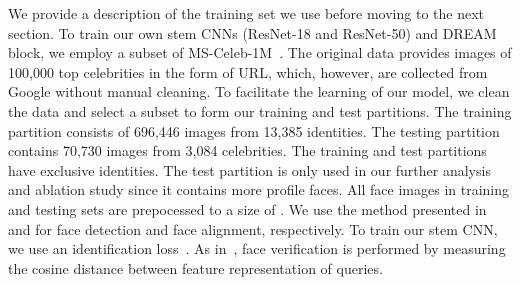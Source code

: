 \documentclass[10pt,twocolumn,letterpaper]{article}
\begin{document}
\begin{table*}[t]
\footnotesize
\begin{center}
\caption{Results on Celebrities in Frontal-Profile (CFP) with Frontal-Profile setting. Equal error rate (EER) is reported. Lower is better. The best result in each row are given in bold.}
\vskip -0.1cm
\label{tab:mainExperiment}
\end{center}
\vspace{-0.25cm}
\vskip -0.4cm
\end{table*}

We provide a description of the training set we use before moving to the next section.
To train our own stem CNNs (ResNet-18 and ResNet-50) and DREAM block, we employ a subset of MS-Celeb-1M~\cite{guo2016ms}. The original data provides images of 100,000 top celebrities in the form of URL, which, however, are collected from Google without manual cleaning. To facilitate the learning of our model, we clean the data and select a subset to form our training and test partitions. The training partition consists of 696,446 images from 13,385 identities. The testing partition contains 70,730 images from 3,084 celebrities. The training and test partitions have exclusive identities. The test partition is only used in our further analysis and ablation study since it contains more profile faces. 
All face images in training and testing sets are prepocessed to a size of . We use the method presented in \cite{zhang2016joint} and \cite{zhu2016unconstrained} for face detection and face alignment, respectively.
To train our stem CNN, we use an identification loss~\cite{sun2014deep}. As in~\cite{nguyen2010cosine}, face verification is performed by measuring the cosine distance between feature representation of queries.
\end{document}
